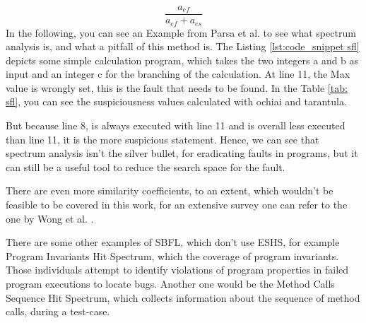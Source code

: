 \begin{equation}
    \frac{a_{ef}}{a_{ef}+a_{es}}
    \label{eq: simple_tarantula}
\end{equation}
In the following, you can see an Example from Parsa et al. \cite{parsa_software_2023} to see what spectrum analysis is, and what a pitfall of this method is.
The Listing \ref{lst:code_snippet sfl} depicts some simple calculation program, which takes the two integers a and b as input and an integer c for the branching of the calculation.
At line 11, the Max value is wrongly set, this is the fault that needs to be found.
In the Table \ref{tab: sfl}, you can see the suspiciousness values calculated with ochiai and tarantula.

But because line 8, is always executed with line 11 and is overall less executed than line 11, it is the more suspicious statement.
Hence, we can see that spectrum analysis isn't the silver bullet, for eradicating faults in programs, but it can still be a useful tool to reduce the search space for the fault.


There are even more similarity coefficients, to an extent, which wouldn't be feasible to be covered in this work, for an extensive survey one can refer to the one by Wong et al. \cite{wong_survey_2016}.

There are some other examples of SBFL, which don't use ESHS, for example Program Invariants Hit Spectrum, which the coverage of program invariants.
Those individuals attempt to identify violations of program properties in failed program executions to locate bugs.
Another one would be the Method Calls Sequence Hit Spectrum, which collects information about the sequence of method calls, during a test-case.